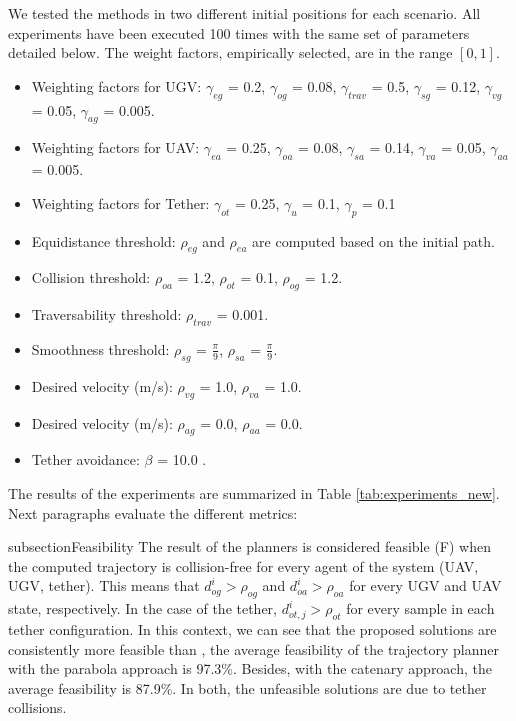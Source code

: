 We tested the methods in two different initial positions for each scenario. All experiments have been executed 100 times with the same set of parameters detailed below. The weight factors, empirically selected, are in the range $[0, 1]$.

\begin{itemize}
    \item Weighting factors for UGV: $\gamma_{eg}$ = 0.2, $\gamma_{og}$ = 0.08, $\gamma_{trav}$ = 0.5, $\gamma_{sg}$ = 0.12, $\gamma_{vg}$ = 0.05, $\gamma_{ag}$ = 0.005. 
    \item Weighting factors for UAV: $\gamma_{ea}$ = 0.25, $\gamma_{oa}$ = 0.08, $\gamma_{sa}$ = 0.14, $\gamma_{va}$ = 0.05, $\gamma_{aa}$ = 0.005. 
    \item Weighting factors for Tether: $\gamma_{ot}$ = 0.25, $\gamma_{u}$ = 0.1, $\gamma_{p}$ = 0.1
    \item Equidistance threshold: $\rho_{eg}$ and $\rho_{ea}$ are computed based on the initial path.   
    \item Collision threshold: $\rho_{oa}$ = 1.2, $\rho_{ot}$ = 0.1, $\rho_{og}$ = 1.2. 
    \item Traversability threshold: $\rho_{trav}$ = 0.001.
    \item Smoothness threshold: $\rho_{sg} $ = $\frac{\pi}{9}$, $\rho_{sa} $ = $\frac{\pi}{9}$.
    \item Desired velocity (m/s): $\rho_{vg}$ = 1.0, $\rho_{va}$ = 1.0.
    \item Desired velocity (m/s): $\rho_{ag}$ = 0.0, $\rho_{aa}$ = 0.0.
    \item Tether avoidance: $\beta$ = 10.0 .
\end{itemize}

The results of the experiments are summarized in Table \ref{tab:experiments_new}. Next paragraphs evaluate the different metrics:


%


subsection{Feasibility}
The result of the planners is considered feasible (F) when the computed trajectory is collision-free for every agent of the system (UAV, UGV, tether). This means that $d^i_{og} > \rho_{og}$ and $d^i_{oa} > \rho_{oa}$ for every UGV and UAV state, respectively. In the case of the tether, $d^i_{ot,j} > \rho_{ot}$ for every sample in each tether configuration. In this context, we can see that the proposed solutions are consistently more feasible than \cite{smartinezr2023}, the average feasibility of the trajectory planner with the parabola approach is 97.3\%. Besides, with the catenary approach, the average feasibility is 87.9\%. In both, the unfeasible solutions are due to tether collisions. %


